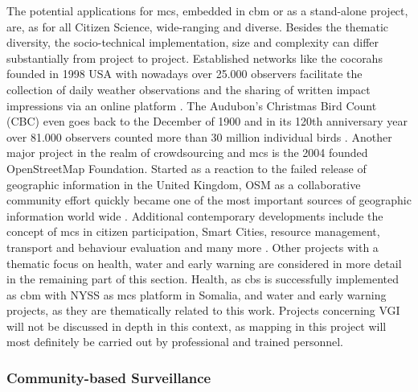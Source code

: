 The potential applications for \acrshort{mcs}, embedded in \acrshort{cbm} or as a stand-alone project, are, as for all Citizen Science, wide-ranging and diverse. Besides the thematic diversity, the socio-technical implementation, size and complexity can differ substantially from project to project. Established networks like the \acrfull{cocorahs} founded in 1998 USA with nowadays over 25.000 observers facilitate the collection of daily weather observations and the sharing of written impact impressions via an online platform \autocite{cocorahsCoCoRaHSCommunityCollaborative2023,lackstromBackyardHydroclimatologyCitizen2022}. The Audubon's Christmas Bird Count (CBC) even goes back to the December of 1900 and in its 120th anniversary year over 81.000 observers counted more than 30 million individual birds \autocite{lebaron122ndChristmasBird2022}. Another major project in the realm of crowdsourcing and \acrshort{mcs} is the 2004 founded OpenStreetMap Foundation. Started as a reaction to the failed release of geographic information in the United Kingdom, OSM as a collaborative community effort quickly became one of the most important sources of geographic information world wide \autocite{bennettOpenStreetMap2010, openstreetmapcontributorsOpenStreetMap}. Additional contemporary developments include the concept of \acrshort{mcs} in citizen participation, Smart Cities, resource management, transport and behaviour evaluation and many more \autocite{dipasDIPASOrgDIPAS2023,europeancommissionCitizencentredApproachSmart2021, wangSurveyApplicationKey2022}. 
Other projects with a thematic focus on health, water and early warning are considered in more detail in the remaining part of this section. Health, as \acrfull{cbs} is successfully implemented as \acrshort{cbm} with NYSS as \acrshort{mcs} platform in Somalia, and water and early warning projects, as they are thematically related to this work. Projects concerning VGI will not be discussed in depth in this context, as mapping in this project will most definitely be carried out by professional and trained personnel.

\subsubsection*{Community-based Surveillance}\label{subsubsec:cbs}

